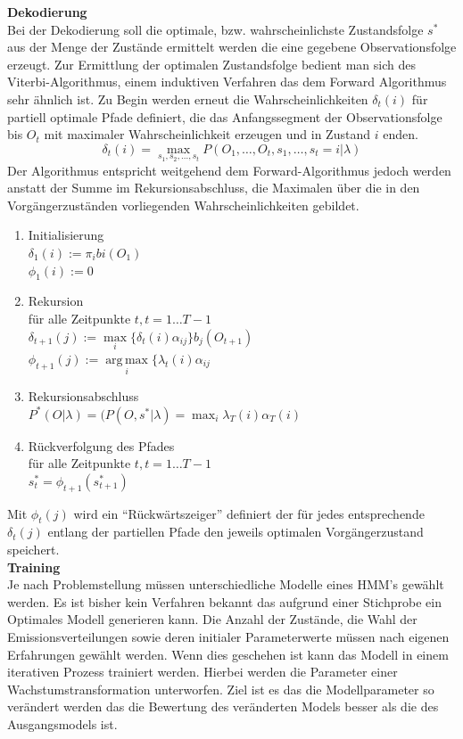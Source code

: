 \textbf{Dekodierung} \\
Bei der Dekodierung soll die optimale, bzw. wahrscheinlichste Zustandsfolge
\(s^*\) aus der Menge der Zustände ermittelt werden die eine gegebene
Observationsfolge erzeugt. Zur Ermittlung der optimalen Zustandsfolge bedient
man sich des Viterbi-Algorithmus, einem induktiven Verfahren das dem Forward
Algorithmus sehr ähnlich ist. Zu Begin werden erneut die Wahrscheinlichkeiten
\(\delta_{t}(i)\) für partiell optimale Pfade definiert, die das Anfangssegment
der Observationsfolge bis \(O_{t}\) mit maximaler Wahrscheinlichkeit erzeugen
und in Zustand \(i\) enden.
\begin{equation}
\delta_{t}(i) =
\max\limits_{s_{1},s_{2}, \ldots
,s_{t}}P(O_{1},\ldots,O_{t},s_{1},\ldots,s_{t}=i|\lambda) 
\end{equation}
Der Algorithmus entspricht weitgehend dem Forward-Algorithmus jedoch werden
anstatt der Summe im Rekursionsabschluss, die Maximalen über die in den
Vorgängerzuständen vorliegenden Wahrscheinlichkeiten gebildet.
\begin{enumerate}
  \item Initialisierung\\
		\(\delta_{1}(i) := \pi_{i}b{i}(O_{1})\)\\
		\(\phi_{1}(i):=0\)
  \item Rekursion\\
	für alle Zeitpunkte \(t, t=1 \ldots T-1\)\\
	\(\delta_{t+1}(j) :=
	\max\limits_{i}\{\delta_{t}(i)\alpha_{ij}\}b_{j}(O_{t+1})\)\\
	\(\phi_{t+1}(j):= \operatorname{arg\,max}\limits_{i}\{\lambda_{t}(i)\alpha_{ij} \)
  \item Rekursionsabschluss\\
  	\(P^{*}(O|\lambda) = (P(O,s^{*}|\lambda) = \max_{i}\lambda_{T}(i)
  	\alpha_{T}(i)\)
  \item Rückverfolgung des Pfades\\
	für alle Zeitpunkte \(t, t=1 \ldots T-1\)\\
	\(s_{t}^{*}=\phi_{t+1}(s_{t+1}^{*})\)
\end{enumerate}
Mit \(\phi_{t}(j)\) wird ein ``Rückwärtszeiger'' definiert der für jedes
entsprechende \(\delta_{t}(j)\) entlang der partiellen Pfade den jeweils
optimalen Vorgängerzustand speichert.\\

\textbf{Training} \\
Je nach Problemstellung müssen unterschiedliche Modelle eines HMM's gewählt
werden. Es ist bisher kein Verfahren bekannt das aufgrund einer Stichprobe ein
Optimales Modell generieren kann. Die Anzahl der Zustände, die Wahl der
Emissionsverteilungen sowie deren initialer Parameterwerte müssen nach eigenen Erfahrungen gewählt werden. Wenn dies geschehen ist kann das Modell in einem iterativen Prozess trainiert werden. Hierbei werden die Parameter einer Wachstumstransformation unterworfen. Ziel ist es das die Modellparameter so verändert werden das die Bewertung des veränderten Models besser als die des Ausgangsmodels ist.\\

